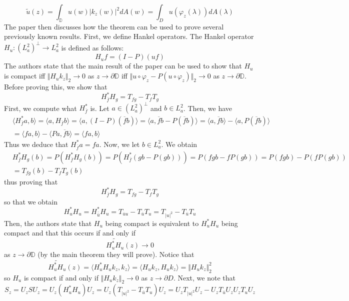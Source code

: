 \documentclass[12pt]{article}
\begin{document}
\[
\tilde{u}(z) = \int_\mathbb{D} u(w) \vert k_z(w) \vert^2 dA(w) = \int_D u(\varphi_z(\lambda)) dA(\lambda)
\] The paper then discusses how the theorem can be used to prove several previously known results. First, we define Hankel operators. The Hankel operator $H_u: (L_a^2)^\perp \rightarrow L_a^2$ is defined as follows: 
\[
H_u f = (I - P)(uf)
\] The authors state that the main result of the paper can be used to show that $H_u$ is compact iff $\Vert H_u k_z \Vert_2 \rightarrow 0$ as $z \rightarrow \partial{\mathbb{D}}$ iff $\Vert u \circ \varphi_z - P(u \circ \varphi_z) \Vert_2 \rightarrow 0$ as $z \rightarrow \partial{\mathbb{D}}$. Before proving this, we show that
\[
H_{\overline{f}}^* H_g = T_{fg} - T_f T_g
\] First, we compute what $H_{\overline{f}}^*$ is. Let $a \in (L_a^2)^\perp$ and $b \in L_a^2$. Then, we have
\begin{align*}
&\langle H_{\overline{f}}^*a, b \rangle = \langle a, H_{\overline{f}} b \rangle = \langle a, (I-P)(\overline{f}b) \rangle = \langle a, \overline{f}b - P(\overline{f}b) \rangle = \langle a, \overline{f}b \rangle - \langle a,  P(\overline{f}b)\rangle \\
&= \langle fa, b \rangle - \langle Pa, \overline{f}b \rangle = \langle fa, b \rangle
\end{align*} Thus we deduce that $H_{\overline{f}}^*a = fa$. Now, we let $b \in L_a^2$. We obtain
\begin{align*}
&H_{\overline{f}}^* H_g(b) = P(H_{\overline{f}}^* H_g(b)) = P(H_{\overline{f}}^*(gb - P(gb))) = P(fgb - fP(gb)) = P(fgb) - P(fP(gb)) \\
&= T_{fg}(b) - T_f T_g(b)
\end{align*} thus proving that 
\[
H_{\overline{f}}^* H_g = T_{fg} - T_f T_g
\] so that we obtain
\[
H_u^* H_u = H_{\overline{\overline{u}}}^* H_u = T_{\overline{u}u} - T_{\overline{u}} T_u = T_{\vert u \vert^2} - T_{\overline{u}}T_u
\] Then, the authors state that $H_u$ being compact is equivalent to $H_u^* H_u$ being compact and that this occurs if and only if 
\[
\widetilde{H_u^* H_u}(z) \rightarrow 0 
\] as $z \rightarrow \partial{\mathbb{D}}$ (by the main theorem they will prove). Notice that
\[
\widetilde{H_u^* H_u}(z) = \langle H_u^* H_u k_z, k_z \rangle = \langle H_u k_z, H_u k_z \rangle = \Vert H_u k_z \Vert_2^2
\] so $H_u$ is compact if and only if $\Vert H_u k_z \Vert_2 \rightarrow 0$ as $z \rightarrow \partial{D}$. Next, we note that
\[
S_z = U_z S U_z = U_z(H_u^* H_u)U_z = U_z(T_{\vert u \vert^2} - T_{\overline{u}}T_u)U_z = U_z T_{\vert u \vert^2} U_z - U_z T_{\overline{u}}U_z U_zT_u U_z
\]
\end{document}
